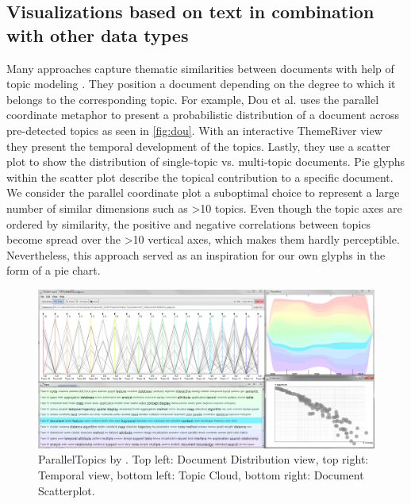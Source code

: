 \subsection{Visualizations based on text in combination with other data types}


Many approaches capture thematic similarities between documents with help of topic modeling \cite{nakazawa} \cite{gretarsson} \cite{Dou2011} \cite{Jiang2016}.
They position a document depending on the degree to which it belongs to the corresponding topic.
For example, Dou et al. \cite{Dou2011} uses the parallel coordinate metaphor to present a probabilistic distribution of a document across pre-detected topics as seen in \autoref{fig:dou}.
With an interactive ThemeRiver view they present the temporal development of the topics.
Lastly, they use a scatter plot to show the distribution of single-topic vs. multi-topic documents.
Pie glyphs within the scatter plot describe the topical contribution to a specific document.
We consider the parallel coordinate plot a suboptimal choice to represent a large number of similar dimensions such as >10 topics.
Even though the topic axes are ordered by similarity, the positive and negative correlations between topics become spread over the >10 vertical axes, which makes them hardly perceptible.
Nevertheless, this approach served as an inspiration for our own glyphs in the form of a pie chart.

\begin{figure}[!]
\centering
\includegraphics[width=\textwidth]{img/dou}
\caption{ParallelTopics by \cite{Dou2011}. Top left: Document Distribution view, top right: Temporal view, bottom left: Topic Cloud, bottom right: Document Scatterplot.}
\label{fig:dou}
\end{figure}

